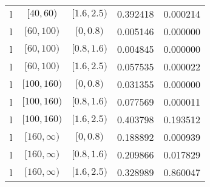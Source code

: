\documentclass[12pt,a4paper]{article}
\begin{document}
\begin{table}[H]
\begin{center}
\begin{tabular}{ c | c | c | c | c }
		l & $[40,60)$ & $[1.6,2.5)$ & 0.392418 & 0.000214 \\
		l & $[60,100)$ & $[0,0.8)$ & 0.005146 & 0.000000 \\
		l & $[60,100)$ & $[0.8,1.6)$ & 0.004845 & 0.000000 \\
		l & $[60,100)$ & $[1.6,2.5)$ & 0.057535 & 0.000022 \\
		l & $[100,160)$ & $[0,0.8)$ & 0.031355 & 0.000000 \\
		l & $[100,160)$ & $[0.8,1.6)$ & 0.077569 & 0.000011 \\
		l & $[100,160)$ & $[1.6,2.5)$ & 0.403798 & 0.193512 \\
		l & $[160,\infty)$ & $[0,0.8)$ & 0.188892 & 0.000939 \\
		l & $[160,\infty)$ & $[0.8,1.6)$ & 0.209866 & 0.017829 \\
		l & $[160,\infty)$ & $[1.6,2.5)$ & 0.328989 & 0.860047 \\
	\end{tabular}
\end{center}
\end{table}
\end{document}
